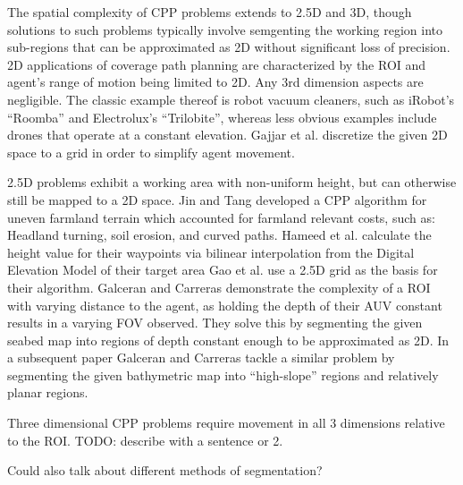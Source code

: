 The spatial complexity of CPP problems extends to 2.5D and 3D, though solutions to such problems typically involve semgenting the working region into sub-regions that can be approximated as 2D without significant loss of precision.
2D applications of coverage path planning are characterized by the ROI and agent's range of motion being limited to 2D.
Any 3rd dimension aspects are negligible.
The classic example thereof is robot vacuum cleaners, such as iRobot's ``Roomba'' and Electrolux's ``Trilobite''\cite{CCPP_cleaning_robots}, whereas less obvious examples include drones that operate at a constant elevation\cite{CPP_2D_convex_regions_uav}.
Gajjar et al. discretize the given 2D space to a grid in order to simplify agent movement\cite{CCPP_known_2D_env}.

2.5D problems exhibit a working area with non-uniform height, but can otherwise still be mapped to a 2D space.
Jin and Tang developed a CPP algorithm for uneven farmland terrain which accounted for farmland relevant costs, such as: Headland turning, soil erosion, and curved paths\cite{CPP_farming_terrain}.
Hameed et al. calculate the height value for their waypoints via bilinear interpolation from the Digital Elevation Model of their target area\cite{CPP_2.5D_agriculture}
Gao et al. use a 2.5D grid as the basis for their algorithm\cite{CPP_2.5D_grid_map}.
Galceran and Carreras demonstrate the complexity of a ROI with varying distance to the agent\cite{CPP_2.5D_seabed_2012}, as holding the depth of their AUV constant results in a varying FOV observed.
They solve this by segmenting the given seabed map into regions of depth constant enough to be approximated as 2D.
In a subsequent paper Galceran and Carreras tackle a similar problem by segmenting the given bathymetric map into ``high-slope'' regions and relatively planar regions\cite{CPP_2.5D_seabed_2013}.

Three dimensional CPP problems require movement in all 3 dimensions relative to the ROI\cite{CPP_survey_for_robotics}.
TODO: describe \cite{HiCPP_cplx_3D_env} with a sentence or 2.

Could also talk about different methods of segmentation?

